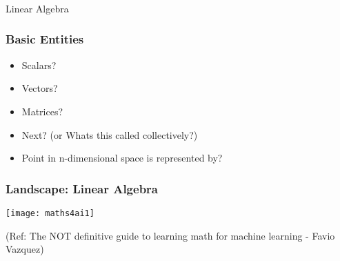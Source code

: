 \begin{frame}[fragile]\frametitle{}
\begin{center}
{\Large Linear Algebra }
\end{center}
\end{frame}

\begin{frame}[fragile]\frametitle{Basic Entities}
\begin{itemize}
\item Scalars?
\item Vectors?
\item Matrices?
\item Next? (or Whats this called collectively?)
\item Point in n-dimensional space is represented by?
\end{itemize}
\end{frame}



 \begin{frame}[fragile] \frametitle{Landscape: Linear Algebra}

\begin{center}
\texttt{[image: maths4ai1]}
\end{center}

{\tiny (Ref: The NOT definitive guide to learning math for machine learning - Favio Vazquez)}

\end{frame}








